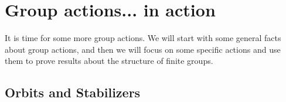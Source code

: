 \documentclass[12pt]{report}
\newtheorem{lemma}[theorem]{Lemma}
\numberwithin{equation}{section}
\numberwithin{theorem}{chapter}
\theoremstyle{definition}
\newtheorem{definition}[theorem]{Definition}
\newtheorem{example}[theorem]{Example}
\newtheorem{exercise}{Exercise}
\newtheorem*{basic properties}{Basic Properties}
\newtheorem*{Important Remark}{Important Remark}
\newcommand{\s}{\sigma}
\begin{document}
\chapter{Group actions... in action}
%
%
%
%
%
%
%
%
%
%


It is time for some more group actions. We will start with some general facts about group actions, and then we will focus on some specific actions and use them to prove results about the structure of finite groups.

\section{Orbits and Stabilizers}
\end{document}
